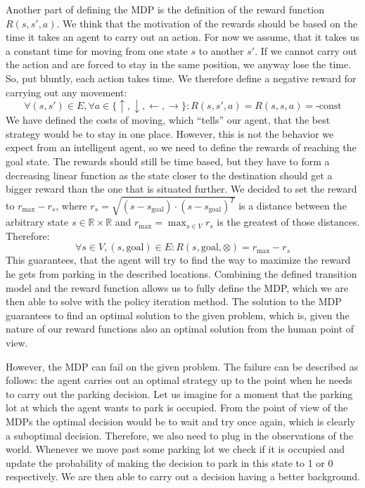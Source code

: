     Another part of defining the MDP is the definition of the reward function $R(s,s',a)$. We think that the motivation of the rewards should be based on the time it takes an agent to carry out an action. For now we assume, that it takes us a constant time for moving from one state $s$ to another $s'$. If we cannot carry out the action and are forced to stay in the same position, we anyway lose the time. So, put bluntly, each action takes time. We therefore define a negative reward for carrying out any movement:
    \begin{equation}
        \forall (s, s') \in E, \forall a \in \{ \uparrow, \downarrow, \leftarrow, \rightarrow \}: R(s, s', a) = R(s, s, a) = \mbox{-const}
    \end{equation}
    We have defined the costs of moving, which ``tells'' our agent, that the best strategy would be to stay in one place. However, this is not the behavior we expect from an intelligent agent, so we need to define the rewards of reaching the goal state. The rewards should still be time based, but they have to form a decreasing linear function as the state closer to the destination should get a bigger reward than the one that is situated further. We decided to set the reward to $r_{\max} - r_s$, where $r_s = \sqrt{(s - s_{\mbox{goal}}) \cdot {(s - s_{\mbox{goal}})}^T}$ is a distance between the arbitrary state $s \in \mathbb{R} \times \mathbb{R}$ and $r_{\max} = \max_{s \in V}r_s$ is the greatest of those distances. Therefore:
    \begin{equation}
        \forall s \in V, (s,\mbox{goal}) \in E : R(s, \mbox{goal}, \otimes) = r_{\max} - r_s
    \end{equation}
    This guarantees, that the agent will try to find the way to maximize the reward he gets from parking in the described locations.
    Combining the defined transition model and the reward function allows us to fully define the MDP, which we are then able to solve with the policy iteration method. The solution to the MDP guarantees to find an optimal solution to the given problem, which is, given the nature of our reward functions also an optimal solution from the human point of view.

    However, the MDP can fail on the given problem. The failure can be described as follows: the agent carries out an optimal strategy up to the point when he needs to carry out the parking decision. Let us imagine for a moment that the parking lot at which the agent wants to park is occupied. From the point of view of the MDPs the optimal decision would be to wait and try once again, which is clearly a suboptimal decision. Therefore, we also need to plug in the observations of the world. Whenever we move past some parking lot we check if it is occupied and update the probability of making the decision to park in this state to 1 or 0 respectively. We are then able to carry out a decision having a better background.

